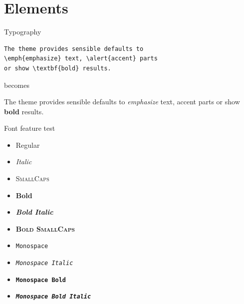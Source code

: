 \documentclass[10pt, aspectratio=169]{beamer}
\begin{document}
\section{Elements}

\begin{frame}[fragile]{Typography}
      \begin{verbatim}The theme provides sensible defaults to
\emph{emphasize} text, \alert{accent} parts
or show \textbf{bold} results.\end{verbatim}

  \begin{center}becomes\end{center}

  The theme provides sensible defaults to \emph{emphasize} text,
  \alert{accent} parts or show \textbf{bold} results.
\end{frame}

\begin{frame}{Font feature test}
  \begin{itemize}
    \item Regular
    \item \textit{Italic}
    \item \textsc{SmallCaps}
    \item \textbf{Bold}
    \item \textbf{\textit{Bold Italic}}
    \item \textbf{\textsc{Bold SmallCaps}}
    \item \texttt{Monospace}
    \item \texttt{\textit{Monospace Italic}}
    \item \texttt{\textbf{Monospace Bold}}
    \item \texttt{\textbf{\textit{Monospace Bold Italic}}}
  \end{itemize}
\end{frame}
\end{document}
